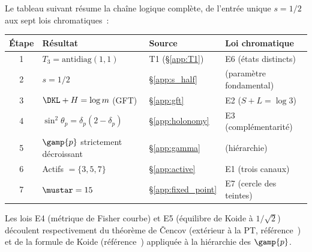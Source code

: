 \documentclass[12pt,a4paper]{article}
\begin{document}
Le tableau suivant r\'esume la cha\^ine logique compl\`ete, de
l'entr\'ee unique $s = 1/2$ aux sept lois chromatiques~:

\begin{center}
\small
\begin{tabular}{clll}
\toprule
\textbf{\'Etape} & \textbf{R\'esultat} & \textbf{Source} & \textbf{Loi chromatique} \\
\midrule
1 & $T_3 = \mathrm{antidiag}(1,1)$ & T1 (\S\ref{app:T1}) & E6 (\'etats distincts) \\
2 & $s = 1/2$ & \S\ref{app:s_half} & (param\`etre fondamental) \\
3 & $\DKL + H = \log m$ (GFT) & \S\ref{app:gft} & E2 ($S + L = \log 3$) \\
4 & $\sin^2\!\theta_p = \delta_p(2-\delta_p)$ & \S\ref{app:holonomy} & E3 (compl\'ementarit\'e) \\
5 & $\gamp{p}$ strictement d\'ecroissant & \S\ref{app:gamma} & (hi\'erarchie) \\
6 & Actifs $= \{3,5,7\}$ & \S\ref{app:active} & E1 (trois canaux) \\
7 & $\mustar = 15$ & \S\ref{app:fixed_point} & E7 (cercle des teintes) \\
\bottomrule
\end{tabular}
\end{center}

\noindent
Les lois E4 (m\'etrique de Fisher courbe) et E5 (\'equilibre de Koide
\`a $1/\sqrt{2}$) d\'ecoulent respectivement du th\'eor\`eme de
\v{C}encov (ext\'erieur \`a la PT, r\'ef\'erence~\cite{cencov1982}) et
de la formule de Koide (r\'ef\'erence~\cite{koide1981}) appliqu\'ee
\`a la hi\'erarchie des $\gamp{p}$.
\end{document}
